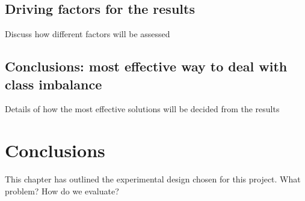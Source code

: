 \subsection{Driving factors for the results}
Discuss how different factors will be assessed
\subsection{Conclusions: most effective way to deal with class imbalance}
Details of how the most effective solutions will be decided from the results




\section{Conclusions}

This chapter has outlined the experimental design chosen for this project. 
What problem?
How do we evaluate?




